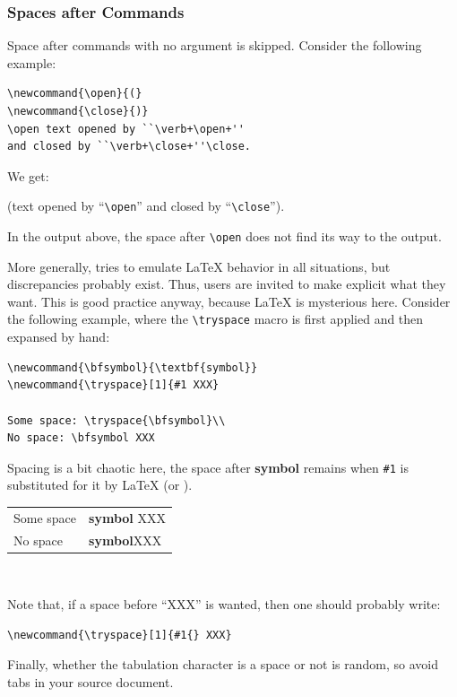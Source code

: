 \subsubsection{Spaces after Commands}
Space after commands with no argument is skipped.
Consider the following example:
\begin{verbatim}
\newcommand{\open}{(}
\newcommand{\close}{)}
\open text opened by ``\verb+\open+''
and closed by ``\verb+\close+''\close.
\end{verbatim}
We get:
\begin{htmlout}
\newcommand{\open}{(}
\newcommand{\close}{)}
\open text opened by ``\verb+\open+'' and closed by
``\verb+\close+''\close.
\end{htmlout}
In the output above, the space after \verb+\open+ does not
find its way to the output.


More generally,
\hevea{} tries to emulate \LaTeX{} behavior in all situations, but
discrepancies probably exist.
Thus, users are invited to make explicit what they want.
This is good practice anyway, because \LaTeX{} is mysterious
here. Consider the following example, where the \verb+\tryspace+
macro is first applied and then expansed by hand:
\begin{verbatim}
\newcommand{\bfsymbol}{\textbf{symbol}}
\newcommand{\tryspace}[1]{#1 XXX}

Some space: \tryspace{\bfsymbol}\\
No space: \bfsymbol XXX
\end{verbatim}
Spacing is a bit chaotic here,
the space after \textbf{symbol} remains when \verb+#1+ is substituted for it
by \LaTeX{} (or \hevea).

\begin{htmlout}
\newcommand{\bfsymbol}{\textbf{symbol}}
\newcommand{\tryspace}[1]{#1 XXX}
\begin{tabular}{l@{~:~}l}
Some space & \tryspace{\bfsymbol}\\
No space   & \bfsymbol XXX
\end{tabular}%
\par ~\vspace{-1ex}
\end{htmlout}
Note that, if a space before ``XXX'' is wanted, then
one should probably write:
\begin{verbatim}
\newcommand{\tryspace}[1]{#1{} XXX}
\end{verbatim}

Finally, whether the tabulation character is a space or not 
is random, so avoid tabs in your source document.

